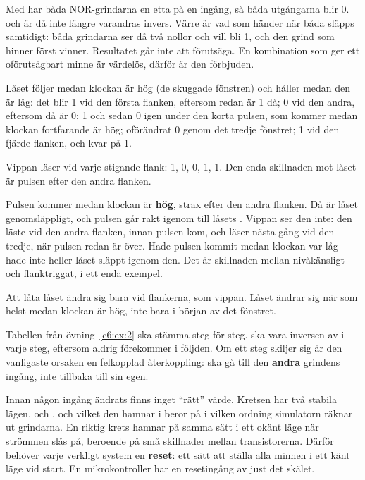 Med  har båda NOR-grindarna en etta på en ingång, så båda utgångarna blir 0.
 och  är då inte längre varandras invers. Värre är vad som händer när båda släpps
samtidigt: båda grindarna ser då två nollor och vill bli 1, och den grind som hinner först vinner.
Resultatet går inte att förutsäga. En kombination som ger ett oförutsägbart minne är värdelös,
därför är den förbjuden.



Låset följer  medan klockan är hög (de skuggade fönstren) och håller medan den är
låg: det blir 1 vid den första flanken, eftersom  redan är 1 då; 0 vid den andra, eftersom
 då är 0; 1 och sedan 0 igen under den korta pulsen, som kommer medan klockan fortfarande
är hög; oförändrat 0 genom det tredje fönstret; 1 vid den fjärde flanken, och kvar på 1.

Vippan läser  vid varje stigande flank: 1, 0, 0, 1, 1. Den enda skillnaden mot låset
är pulsen efter den andra flanken.

Pulsen kommer medan klockan är \textbf{hög}, strax efter den andra flanken. Då är låset
genomsläppligt, och pulsen går rakt igenom till låsets . Vippan ser den inte: den läste
 vid den andra flanken, innan pulsen kom, och läser nästa gång vid den tredje, när pulsen
redan är över. Hade pulsen kommit medan klockan var låg hade inte heller låset släppt igenom den.
Det är skillnaden mellan nivåkänsligt och flanktriggat, i ett enda exempel.

Att låta låset ändra sig bara vid flankerna, som vippan. Låset ändrar sig när
som helst medan klockan är hög, inte bara i början av det fönstret.

Tabellen från övning~\ref{c6:ex:2} ska stämma steg för steg.  ska vara
inversen av  i varje steg, eftersom  aldrig förekommer i följden. Om ett
steg skiljer sig är den vanligaste orsaken en felkopplad återkoppling:  ska gå till den
\textbf{andra} grindens ingång, inte tillbaka till sin egen.

Innan någon ingång ändrats finns inget \enquote{rätt} värde. Kretsen har två stabila lägen,
 och , och vilket den hamnar i beror på i vilken ordning simulatorn räknar
ut grindarna. En riktig krets hamnar på samma sätt i ett okänt läge när strömmen slås på, beroende
på små skillnader mellan transistorerna. Därför behöver varje verkligt system en \textbf{reset}: ett
sätt att ställa alla minnen i ett känt läge vid start. En mikrokontroller har en resetingång av
just det skälet.

